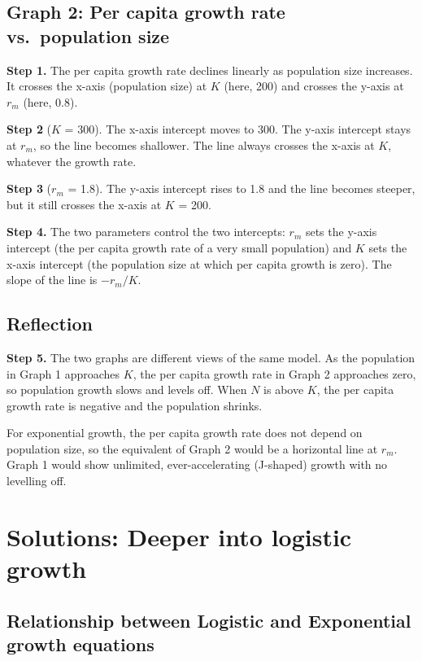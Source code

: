 \documentclass[
  a4paper]{book}
\begin{document}
\subsection{Graph 2: Per capita growth rate vs.~population size}\label{graph-2-per-capita-growth-rate-vs.-population-size-1}

\textbf{Step 1.} The per capita growth rate declines linearly as population size increases. It crosses the x-axis (population size) at \(K\) (here, 200) and crosses the y-axis at \(r_m\) (here, 0.8).

\textbf{Step 2} (\(K\) = 300). The x-axis intercept moves to 300. The y-axis intercept stays at \(r_m\), so the line becomes shallower. The line always crosses the x-axis at \(K\), whatever the growth rate.

\textbf{Step 3} (\(r_m\) = 1.8). The y-axis intercept rises to 1.8 and the line becomes steeper, but it still crosses the x-axis at \(K\) = 200.

\textbf{Step 4.} The two parameters control the two intercepts: \(r_m\) sets the y-axis intercept (the per capita growth rate of a very small population) and \(K\) sets the x-axis intercept (the population size at which per capita growth is zero). The slope of the line is \(-r_m/K\).

\subsection{Reflection}\label{reflection}

\textbf{Step 5.} The two graphs are different views of the same model. As the population in Graph 1 approaches \(K\), the per capita growth rate in Graph 2 approaches zero, so population growth slows and levels off. When \(N\) is above \(K\), the per capita growth rate is negative and the population shrinks.

For exponential growth, the per capita growth rate does not depend on population size, so the equivalent of Graph 2 would be a horizontal line at \(r_m\). Graph 1 would show unlimited, ever-accelerating (J-shaped) growth with no levelling off.

\section{Solutions: Deeper into logistic growth}\label{solutions-deeper-into-logistic-growth}

\subsection{Relationship between Logistic and Exponential growth equations}\label{relationship-between-logistic-and-exponential-growth-equations}
\end{document}
